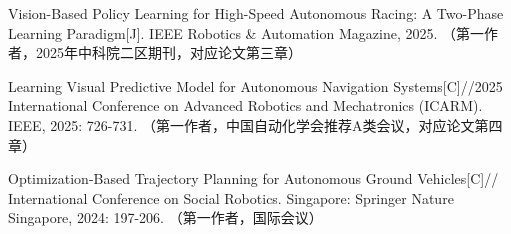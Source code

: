 \cleardoublepage
{}

\noindent [1] Vision-Based Policy Learning for High-Speed Autonomous Racing: A Two-Phase Learning Paradigm[J]. IEEE Robotics \& Automation Magazine, 2025. （第一作者，2025年中科院二区期刊，对应论文第三章）

\vspace{10pt}
\noindent [2] Learning Visual Predictive Model for Autonomous Navigation Systems[C]//2025 International Conference on Advanced Robotics and Mechatronics (ICARM). IEEE, 2025: 726-731. （第一作者，中国自动化学会推荐A类会议，对应论文第四章）

\vspace{10pt}
\noindent [3] Optimization-Based Trajectory Planning for Autonomous Ground Vehicles[C]// International Conference on Social Robotics. Singapore: Springer Nature Singapore, 2024: 197-206. （第一作者，国际会议）